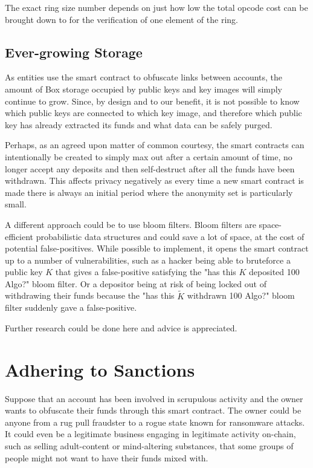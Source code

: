 \documentclass[9pt]{article}
\begin{document}
The exact ring size number depends on just how low the total opcode cost can be brought down to for the verification of one element of the ring.


\subsection{Ever-growing Storage}

As entities use the smart contract to obfuscate links between accounts, the amount of Box storage occupied by public keys and key images will simply continue to grow. Since, by design and to our benefit, it is not possible to know which public keys are connected to which key image, and therefore which public key has already extracted its funds and what data can be safely purged.

Perhaps, as an agreed upon matter of common courtesy, the smart contracts can intentionally be created to simply max out after a certain amount of time,  no longer accept any deposits and then self-destruct after all the funds have been withdrawn. This affects privacy negatively as every time a new smart contract is made there is always an initial period where the anonymity set is particularly small.

A different approach could be to use bloom filters. Bloom filters are space-efficient probabilistic data structures and could save a lot of space, at the cost of potential false-positives. While possible to implement, it opens the smart contract up to a number of vulnerabilities, such as a hacker being able to bruteforce a public key $K$ that gives a false-positive satisfying the "has this $K$ deposited 100 Algo?" bloom filter. Or a depositor being at risk of being locked out of withdrawing their funds because the "has this $\tilde{K}$ withdrawn 100 Algo?" bloom filter suddenly gave a false-positive.

Further research could be done here and advice is appreciated.

\section{Adhering to Sanctions} \label{section:sanctions}

Suppose that an account has been involved in scrupulous activity and the owner wants to obfuscate their funds through this smart contract. The owner could be anyone from a rug pull fraudster to a rogue state known for ransomware attacks. It could even be a legitimate business engaging in legitimate activity on-chain, such as selling adult-content or mind-altering substances, that some groups of people might not want to have their funds mixed with. 
\end{document}
